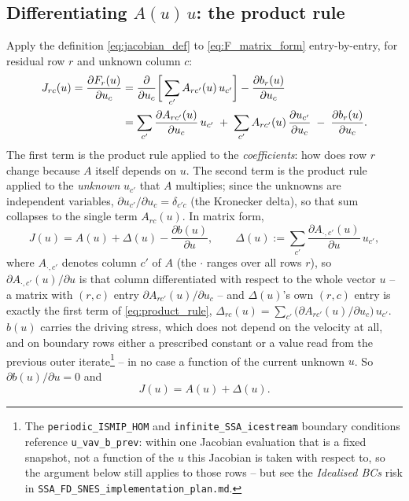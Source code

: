 \documentclass[11pt]{article}
\newcommand{\code}[1]{\texttt{#1}}
\newcommand{\pd}[2]{\dfrac{\partial #1}{\partial #2}}
\begin{document}
\subsection{Differentiating $A(u)\,u$: the product rule}

Apply the definition \eqref{eq:jacobian_def} to \eqref{eq:F_matrix_form}
entry-by-entry, for residual row $r$ and unknown column $c$:
\begin{align}
J_{rc}(u) = \pd{F_r(u)}{u_c}
  &= \pd{}{u_c}\bigg[\sum_{c'} A_{rc'}(u)\,u_{c'}\bigg] - \pd{b_r(u)}{u_c} \notag \\
  &= \sum_{c'} \pd{A_{rc'}(u)}{u_c}\,u_{c'} \;+\; \sum_{c'} A_{rc'}(u)\,\pd{u_{c'}}{u_c}
     \;-\; \pd{b_r(u)}{u_c}. \label{eq:product_rule}
\end{align}
The first term is the product rule applied to the \emph{coefficients}: how
does row $r$ change because $A$ itself depends on $u$. The second term is the
product rule applied to the \emph{unknown} $u_{c'}$ that $A$ multiplies; since
the unknowns are independent variables, $\partial u_{c'}/\partial u_c =
\delta_{c'c}$ (the Kronecker delta), so that sum collapses to the single term
$A_{rc}(u)$. In matrix form,
\begin{equation}
J(u) = A(u) + \Delta(u) - \pd{b(u)}{u}, \qquad
\Delta(u) := \sum_{c'} \pd{A_{\cdot,c'}(u)}{u}\,u_{c'},
\label{eq:jacobian_split}
\end{equation}
where $A_{\cdot,c'}$ denotes column $c'$ of $A$ (the $\cdot$ ranges over all
rows $r$), so $\partial A_{\cdot,c'}(u)/\partial u$ is that column
differentiated with respect to the whole vector $u$ -- a matrix with $(r,c)$
entry $\partial A_{rc'}(u)/\partial u_c$ -- and $\Delta(u)$'s own $(r,c)$ entry
is exactly the first term of \eqref{eq:product_rule}, $\Delta_{rc}(u) =
\sum_{c'} \big(\partial A_{rc'}(u)/\partial u_c\big)\,u_{c'}$.
$b(u)$ carries the driving stress, which does not depend on the velocity at
all, and on boundary rows either a prescribed constant or a value read from
the previous outer iterate\footnote{The \code{periodic\_\allowbreak ISMIP\_\allowbreak HOM} and
\code{infinite\_\allowbreak SSA\_\allowbreak icestream} boundary conditions reference
\code{u\_\allowbreak vav\_\allowbreak b\_\allowbreak prev}: within one Jacobian evaluation that is a fixed
snapshot, not a function of the $u$ this Jacobian is taken with respect to, so
the argument below still applies to those rows -- but see the
\emph{Idealised BCs} risk in \code{SSA\_\allowbreak FD\_\allowbreak SNES\_\allowbreak implementation\_\allowbreak plan.md}.}
-- in no case a function of the current unknown $u$. So $\partial b(u)/\partial u = 0$ and
\begin{equation}
\boxed{\,J(u) = A(u) + \Delta(u).\,}
\label{eq:jacobian_final}
\end{equation}
\end{document}
